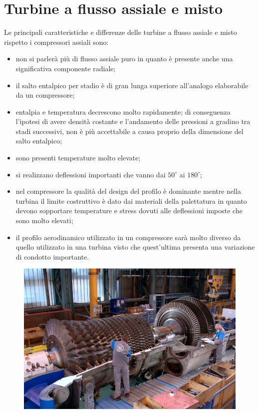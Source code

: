 \chapter{Turbine a flusso assiale e misto}
Le principali caratteristiche e differenze delle turbine a flusso assiale e misto rispetto i compressori assiali sono:
\begin{itemize}
	\item non si parlerà più di flusso assiale puro in quanto è presente anche una significativa componente radiale;
	\item il salto entalpico per stadio è di gran lunga superiore all'analogo elaborabile da un compressore;	
	\item entalpia e temperatura decrescono molto rapidamente; di conseguenza l'ipotesi di avere densità costante e l'andamento delle pressioni a gradino tra stadi successivi, non è più accettabile a causa proprio della dimensione del salto entalpico;
	\item sono presenti temperature molto elevate;
	\item si realizzano deflessioni importanti che vanno dai $50^{\circ}$ ai $180^{\circ}$;
	\item nel compressore la qualità del design del profilo è dominante mentre nella turbina il limite costruttivo è dato dai materiali della palettatura in quanto devono sopportare temperature e stress dovuti alle deflessioni imposte che sono molto elevati;
	\item il profilo aerodinamico utilizzato in un compressore sarà molto diverso da quello utilizzato in una turbina visto che quest'ultima presenta una variazione di condotto importante.
\end{itemize}
\begin{figure}[h!]
\centering
  \includegraphics[width=.9\textwidth]{fig/TurboGas.png}
\caption{}
\label{fig:TurboGas}
\end{figure}

